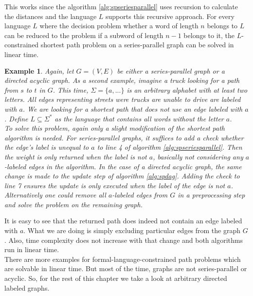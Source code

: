 \documentclass[]{article}
\newtheorem{example}[theorem]{Example}
\numberwithin{equation}{section}
\begin{document}
This works since the algorithm \ref{alg:spseriesparallel} uses recursion to calculate the distances and the language $L$ supports this recursive approach. For every language $L$ where the decision problem whether a word of length $n$ belongs to $L$ can be reduced to the problem if a subword of length $n-1$ belongs to it, the $L$-constrained shortest path problem on a series-parallel graph can be solved in linear time.

\begin{example}
	Again, let $G=(V,E)$ be either a series-parallel graph or a directed acyclic graph. As a second example, imagine a truck looking for a path from $s$ to $t$ in $G$. This time, $\Sigma = \{a, ...\}$ is an arbitrary alphabet with at least two letters. All edges representing streets were trucks are unable to drive are labeled with $a$. We are looking for a shortest path that does not use an edge labeled with $a$. Define $L \subseteq \Sigma^*$ as the language that contains all words without the letter $a$.\\
	
	To solve this problem, again only a slight modification of the shortest path algorithm is needed. For series-parallel graphs, it suffices to add a check whether the edge's label is unequal to $a$ to line 4 of algorithm \ref{alg:spseriesparallel}. Then the weight is only returned when the label is not $a$, basically not considering any $a$-labeled edges in the algorithm. In the case of a directed acyclic graph, the same change is made to the update step of algorithm \ref{alg:spdag}. Adding the check to line 7 ensures the update is only executed when the label of the edge is not $a$.\\
	Alternatively one could remove all $a$-labeled edges from $G$ in a preprocessing step and solve the problem on the remaining graph.
\end{example}

It is easy to see that the returned path does indeed not contain an edge labeled with $a$. What we are doing is simply excluding particular edges from the graph $G$. Also, time complexity does not increase with that change and both algorithms run in linear time.\\

There are more examples for formal-language-constrained path problems which are solvable in linear time. But most of the time, graphs are not series-parallel or acyclic. So, for the rest of this chapter we take a look at arbitrary directed labeled graphs.
\end{document}
